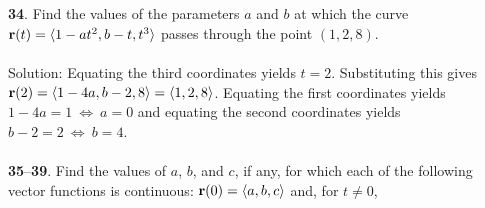 \documentclass[12pt]{amsbook}
\newcommand{\la}{\langle}
\newcommand{\ra}{\rangle}
\begin{document}
\\
\\
{\small\bf 34}. Find the values of the parameters $a$ and $b$ at which the curve ${\bf r}(t)=\la 1-at^2,  b-t, t^3 \ra$ passes through the point $(1, 2, 8)$.
\\
\\
{\sc Solution}: Equating the third coordinates yields $t=2$. Substituting this gives ${\bf r}(2)=\la 1-4a, b-2, 8 \ra=\la 1,2,8 \ra$. Equating the first coordinates yields $1-4a=1 \ \Leftrightarrow \ a=0$ and equating the second coordinates yields $b-2=2 \ \Leftrightarrow \ b=4$. 
\\
\\
\noindent
{\small {\bf 35}--{\bf 39}}. Find the values of $a$, $b$, and $c$, if any, for which each of the following
vector functions is continuous: ${\bf r}(0) = \la a, b, c \ra$ and, for $t \neq 0$,
\end{document}
